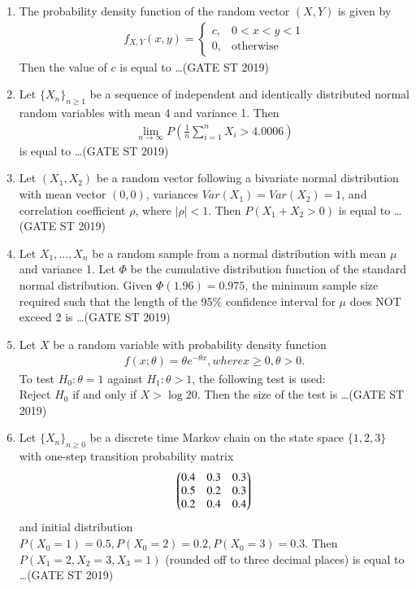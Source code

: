 \documentclass[journal]{IEEEtran}
\begin{document}
\begin{enumerate}[start=1]
\item The probability density function of the random vector \((X, Y)\) is given by
\begin{align*}
f_{X,Y}(x,y) = \begin{cases}
c, & 0 < x < y < 1 \\
0, & \text{otherwise}
\end{cases}
\end{align*}
Then the value of \(c\) is equal to \ldots \hfill(GATE ST 2019)

\item Let \(\{X_n\}_{n \geq 1}\) be a sequence of independent and identically distributed normal random variables with mean 4 and variance 1. Then
\begin{align*}
\lim_{n \to \infty} P\left(\frac{1}{n} \sum_{i=1}^n X_i > 4.0006\right)
\end{align*}
is equal to \ldots \hfill(GATE ST 2019)

\item Let \((X_1, X_2)\) be a random vector following a bivariate normal distribution with mean vector \((0, 0)\), variances \(Var(X_1) = Var(X_2) = 1\), and correlation coefficient \(\rho\), where \(|\rho| < 1\). Then $P(X_1 + X_2 > 0)$ is equal to \ldots \hfill(GATE ST 2019)

\item Let \(X_1, \ldots, X_n\) be a random sample from a normal distribution with mean \(\mu\) and variance 1. Let \(\Phi\) be the cumulative distribution function of the standard normal distribution. Given \(\Phi(1.96) = 0.975\), the minimum sample size required such that the length of the 95\% confidence interval for \(\mu\) does NOT exceed 2 is \ldots \hfill(GATE ST 2019)

\item Let \(X\) be a random variable with probability density function
\begin{align*}
f(x; \theta) = \theta e^{-\theta x}, where  x \geq 0, \theta > 0.
\end{align*}
To test \(H_0: \theta = 1\) against \(H_1: \theta > 1\), the following test is used: \\
Reject \(H_0\) if and only if \(X > \log 20\). Then the size of the test is \ldots \hfill(GATE ST 2019)

\item Let \(\{X_n\}_{n \geq 0}\) be a discrete time Markov chain on the state space \(\{1,2,3\}\) with one-step transition probability matrix
\begin{align*}
\begin{pmatrix}0.4 & 0.3 & 0.3 \\
0.5 & 0.2 & 0.3 \\
0.2 & 0.4 & 0.4\end{pmatrix}
\end{align*}
and initial distribution \(P(X_0 = 1) = 0.5, P(X_0 = 2) = 0.2, P(X_0 = 3) = 0.3\).
Then \(P(X_1 = 2, X_2 = 3, X_3 = 1)\) (rounded off to three decimal places) is equal to \ldots \hfill(GATE ST 2019)


\end{enumerate}
\end{document}
